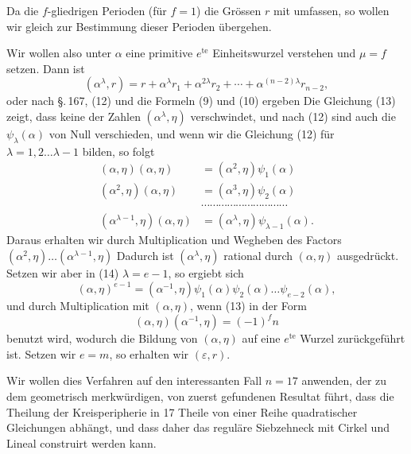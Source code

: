 Da die $f$-gliedrigen Perioden (f\"ur $f = 1$) die Gr\"ossen $r$ mit
umfassen, so wollen wir gleich zur Bestimmung dieser Perioden
\"ubergehen.

Wir wollen also unter $\alpha$ eine primitive $e^{\mathrm{te}}$ Einheitswurzel
verstehen und $\mu = f$ setzen.
Dann ist
\[ (\alpha^\lambda, r) = r + \alpha^\lambda r_1 + \alpha^{2\lambda} r_2 + \cdots + \alpha^{(n-2)\lambda} r_{n-2}, \]
oder nach \S.\,167, (12)
und die Formeln (9) und (10) ergeben
Die Gleichung (13) zeigt, dass keine der Zahlen $(\alpha^\lambda, \eta)$ verschwindet,
und nach (12) sind auch die $\psi_\lambda(\alpha)$ von Null verschieden,
und wenn wir die Gleichung (12) f\"ur $\lambda = 1, 2 \ldots \lambda - 1$
bilden, so folgt
\[
\begin{aligned}
(\alpha, \eta)(\alpha, \eta) &= (\alpha^2, \eta)\psi_1(\alpha)\\
(\alpha^2, \eta)(\alpha, \eta) &= (\alpha^3, \eta)\psi_2(\alpha)\\
&\cdots\cdots\cdots\cdots\cdots\cdots\cdots\cdots\cdots\cdots\\
(\alpha^{\lambda-1}, \eta)(\alpha, \eta) &= (\alpha^\lambda, \eta)\psi_{\lambda-1}(\alpha).
\end{aligned}
\]
Daraus erhalten wir durch Multiplication und Wegheben
des Factors $(\alpha^2, \eta) \ldots (\alpha^{\lambda-1}, \eta)$
Dadurch ist $(\alpha^\lambda, \eta)$ rational durch $(\alpha, \eta)$ ausgedr\"uckt. Setzen
wir aber in (14) $\lambda = e - 1$, so ergiebt sich
\[ (\alpha, \eta)^{e-1} = (\alpha^{-1}, \eta)\psi_1(\alpha)\psi_2(\alpha) \ldots \psi_{e-2}(\alpha), \]
und durch Multiplication mit $(\alpha, \eta)$, wenn (13) in der Form
\[ (\alpha, \eta)(\alpha^{-1}, \eta) = (-1)^f n \]
benutzt wird,
wodurch die Bildung von $(\alpha, \eta)$ auf eine $e^{\mathrm{te}}$ Wurzel zur\"uckgef\"uhrt ist. Setzen wir $e = m$, so erhalten wir $(\varepsilon, r)$.

Wir wollen dies Verfahren auf den interessanten Fall $n = 17$
anwenden, der zu dem geometrisch merkw\"urdigen, von 
zuerst gefundenen Resultat f\"uhrt, dass die Theilung der Kreisperipherie
 in 17 Theile von einer Reihe quadratischer Gleichungen
 abh\"angt, und dass daher das regul\"are Siebzehneck mit
Cirkel und Lineal construirt werden kann.
